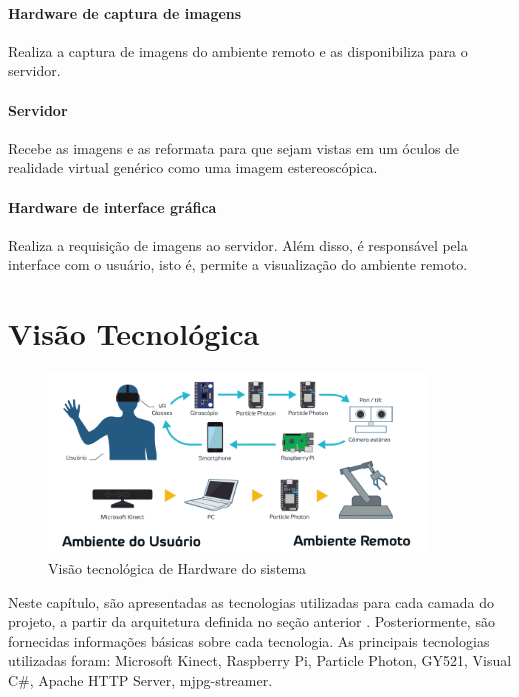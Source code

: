 	\paragraph{Hardware de captura de imagens}\label{par-arq-cam}
	Realiza a captura de imagens do ambiente remoto e as disponibiliza para o servidor. 
	\paragraph{Servidor}\label{par-arq-server}
	Recebe as imagens e as reformata para que sejam vistas em um óculos de realidade virtual genérico como uma imagem estereoscópica.
	\paragraph{Hardware de interface gráfica}\label{par-arq-cell}
	Realiza a requisição de imagens ao servidor. Além disso, é responsável pela interface com o usuário, isto é, permite a visualização do ambiente remoto.

	\section{Visão Tecnológica}\label{sec-tec}
		\begin{figure}[h!]
		\caption{\label{fig_tech}  Visão tecnológica de Hardware do sistema}
		\begin{center}
			\includegraphics[width=100mm]{visaotecnologica.pdf}	
		\end{center}
	\end{figure}
	Neste capítulo, são apresentadas as tecnologias utilizadas para cada camada do
	projeto, a partir da arquitetura definida no seção anterior . Posteriormente, são fornecidas informações básicas sobre cada tecnologia. As principais tecnologias utilizadas foram: Microsoft Kinect, Raspberry Pi, Particle Photon, GY521, Visual C\#, Apache HTTP Server, mjpg-streamer.\par
	

